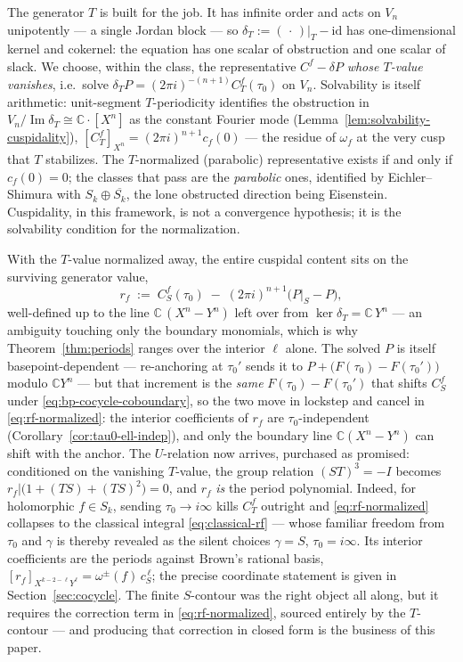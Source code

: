 \documentclass[11pt]{article}
\numberwithin{equation}{section}  %
\newcommand{\CC}{\mathbb{C}}
\DeclareMathOperator{\im}{Im}
\begin{document}
The generator $T$ is built for the job.  It has infinite order and acts
on $V_n$ unipotently --- a single Jordan block --- so
$\delta_T := (\,\cdot\,)|_T - \mathrm{id}$ has one-dimensional kernel
and cokernel: the equation has one scalar of obstruction and one scalar
of slack.  We choose, within the class, the representative
$C^f - \delta P$ \emph{whose $T$-value vanishes}, i.e.\ solve
$\delta_T P = (2\pi i)^{-(n+1)} C^f_T(\tau_0)$ on $V_n$.  Solvability is
itself arithmetic: unit-segment $T$-periodicity identifies the
obstruction in $V_n / \im \delta_T \cong \CC \cdot [X^n]$ as the
constant Fourier mode (Lemma~\ref{lem:solvability-cuspidality}),
$[C^f_T]_{X^n} = (2\pi i)^{n+1} c_f(0)$ --- the residue of $\omega_f$ at
the very cusp that $T$ stabilizes.  The $T$-normalized (parabolic) representative exists
if and only if $c_f(0) = 0$; the classes that pass are the \emph{parabolic}
ones, identified by Eichler--Shimura \cite{KZ1984, BCD2018} with
$S_k \oplus \overline{S_k}$, the lone obstructed direction being
Eisenstein.  Cuspidality, in this framework, is not a convergence
hypothesis; it is the solvability condition for the normalization.

With the $T$-value normalized away, the entire cuspidal content sits on
the surviving generator value,
\begin{equation}\label{eq:rf-normalized}
  r_f \;:=\; C^f_S(\tau_0) \;-\; (2\pi i)^{n+1}\bigl(P|_S - P\bigr),
\end{equation}
well-defined up to the line $\CC\,(X^n - Y^n)$ left over from
$\ker \delta_T = \CC\, Y^n$ --- an ambiguity touching only the boundary
monomials, which is why Theorem~\ref{thm:periods} ranges over the
interior $\ell$ alone.  The solved $P$ is itself basepoint-dependent ---
re-anchoring at $\tau_0'$ sends it to $P + \bigl(F(\tau_0)-F(\tau_0')\bigr)$
modulo $\CC Y^n$ --- but that increment is the \emph{same}
$F(\tau_0)-F(\tau_0')$ that shifts $C^f_S$ under
\eqref{eq:bp-cocycle-coboundary}, so the two move in lockstep and cancel
in \eqref{eq:rf-normalized}: the interior coefficients of $r_f$ are
$\tau_0$-independent (Corollary~\ref{cor:tau0-ell-indep}), and only the
boundary line $\CC(X^n - Y^n)$ can shift with the anchor.  The $U$-relation now arrives, purchased as
promised: conditioned on the vanishing $T$-value, the group relation
$(ST)^3 = -I$ becomes $r_f|\bigl(1 + (TS) + (TS)^2\bigr) = 0$, and $r_f$
\emph{is} the period polynomial.  Indeed, for holomorphic $f \in S_k$,
sending $\tau_0 \to i\infty$ kills $C^f_T$ outright and
\eqref{eq:rf-normalized} collapses to the classical integral
\eqref{eq:classical-rf} --- whose familiar freedom from $\tau_0$ and
$\gamma$ is thereby revealed as the silent choices $\gamma = S$,
$\tau_0 = i\infty$.  Its interior coefficients are the periods against
Brown's rational basis,
$[r_f]_{X^{k-2-\ell}Y^\ell} = \omega^\pm(f)\, c_S^{\,\ell}$; the precise
coordinate statement is given in Section~\ref{sec:cocycle}.  The finite
$S$-contour was the right object all along, but it requires the
correction term in \eqref{eq:rf-normalized}, sourced entirely by the
$T$-contour --- and producing that correction in closed form is the
business of this paper.
\end{document}
